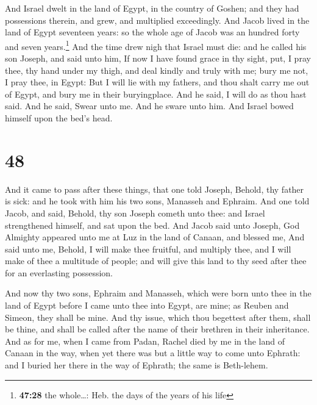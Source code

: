  And Israel dwelt in the land of Egypt, in the country of
Goshen; and they had possessions therein, and grew, and multiplied
exceedingly.  And Jacob lived in the land of Egypt
seventeen years: so the whole age of Jacob was an hundred forty and
seven years.\footnote{\textbf{47:28} the whole\ldots: Heb. the days of
  the years of his life}  And the time drew nigh that
Israel must die: and he called his son Joseph, and said unto him, If now
I have found grace in thy sight, put, I pray thee, thy hand under my
thigh, and deal kindly and truly with me; bury me not, I pray thee, in
Egypt:  But I will lie with my fathers, and thou shalt
carry me out of Egypt, and bury me in their buryingplace. And he said, I
will do as thou hast said.  And he said, Swear unto me.
And he sware unto him. And Israel bowed himself upon the bed's head.

\hypertarget{section-47}{%
\section{48}\label{section-47}}

 And it came to pass after these things, that one told
Joseph, Behold, thy father is sick: and he took with him his two sons,
Manasseh and Ephraim.  And one told Jacob, and said,
Behold, thy son Joseph cometh unto thee: and Israel strengthened
himself, and sat upon the bed.  And Jacob said unto
Joseph, God Almighty appeared unto me at Luz in the land of Canaan, and
blessed me,  And said unto me, Behold, I will make thee
fruitful, and multiply thee, and I will make of thee a multitude of
people; and will give this land to thy seed after thee for an
everlasting possession.

 And now thy two sons, Ephraim and Manasseh, which were
born unto thee in the land of Egypt before I came unto thee into Egypt,
are mine; as Reuben and Simeon, they shall be mine.  And
thy issue, which thou begettest after them, shall be thine, and shall be
called after the name of their brethren in their inheritance.
 And as for me, when I came from Padan, Rachel died by me
in the land of Canaan in the way, when yet there was but a little way to
come unto Ephrath: and I buried her there in the way of Ephrath; the
same is Beth-lehem.


